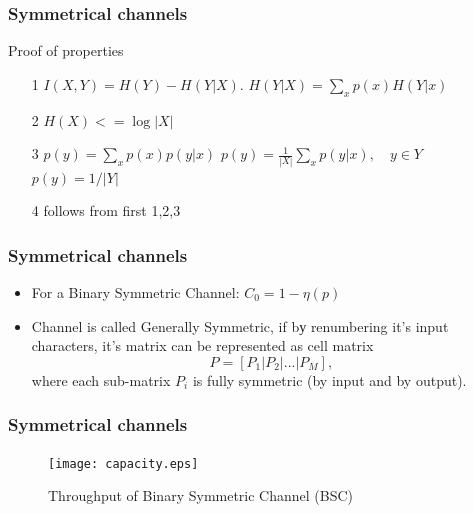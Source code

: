 \documentclass[14pt]{beamer}
\begin{document}
\begin{frame}
\frametitle{Symmetrical channels}
Proof of properties
\begin{itemize}


    \item[1]
        $I(X,Y) = H(Y) - H(Y\vert X)$. 
        $H(Y\vert X) = \sum\limits_x {p(x)H(Y\vert x)}$
    
    \item[2]
        $H(X) <= \log |X|$
    
    \item[3]
        $p(y) = \sum\limits_x {p(x)p(y\vert x)}$
        $p(y) = \frac{1}{\left| X \right|}\sum\limits_x {p(y\vert x)} , \quad y \in Y $
        $p(y) = 1 / \left| Y \right|$
        
    \item[4] 
        follows from first 1,2,3


\end{itemize}
\end{frame}


\begin{frame}
\frametitle{Symmetrical channels}
\begin{itemize}

    \item For a Binary Symmetric Channel: $C_0 = 1 - \eta(p)$
    
    \item Channel is called Generally Symmetric, if bу renumbering it's input characters, it's matrix can be represented as cell matrix
    \begin{equation}
    \label{eq5_41} P = \left[ {\left. {P_1 } \right|\left. {P_2 }
    \right|...\left| {P_M } \right.} \right],
    \end{equation}
    where each sub-matrix $P_i$ is fully symmetric (by input and by output).

\end{itemize}
\end{frame}


\begin{frame}
\frametitle{Symmetrical channels}
\begin{itemize}
    \begin{figure}[ht]
    \begin{minipage}{1.0\linewidth}
    \texttt{[image: capacity.eps]}
    \caption{Throughput of Binary Symmetric Channel (BSC)} \label{capacity}
    \end{minipage}
    \end{figure}
\end{itemize}
\end{frame}
\end{document}

